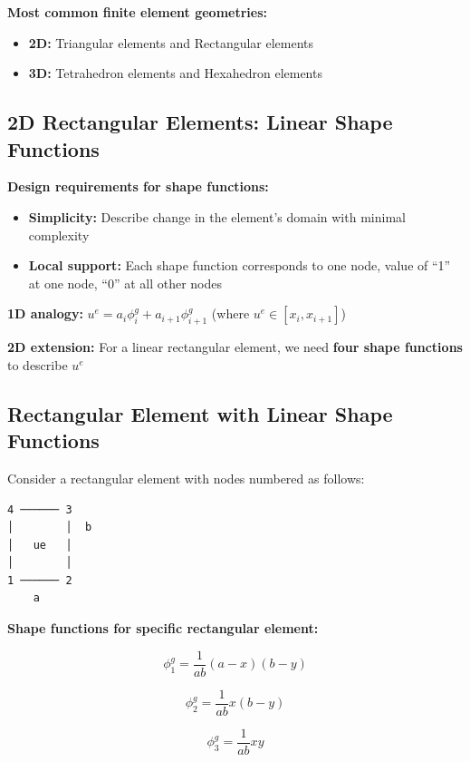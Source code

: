 \documentclass[
  11pt,
  a4paper,
]{scrbook}
\providecommand{\tightlist}{%
  \setlength{\itemsep}{0pt}\setlength{\parskip}{0pt}}\usepackage{longtable,booktabs,array}
\begin{document}
\textbf{Most common finite element geometries:}

\begin{itemize}
\tightlist
\item
  \textbf{2D:} Triangular elements and Rectangular elements
\item
  \textbf{3D:} Tetrahedron elements and Hexahedron elements
\end{itemize}

\subsection{2D Rectangular Elements: Linear Shape
Functions}\label{d-rectangular-elements-linear-shape-functions}

\textbf{Design requirements for shape functions:}

\begin{itemize}
\tightlist
\item
  \textbf{Simplicity:} Describe change in the element's domain with
  minimal complexity
\item
  \textbf{Local support:} Each shape function corresponds to one node,
  value of ``1'' at one node, ``0'' at all other nodes
\end{itemize}

\textbf{1D analogy:} \(u^e = a_i \phi_i^g + a_{i+1} \phi_{i+1}^g\)
(where \(u^e \in [x_i, x_{i+1}]\))

\textbf{2D extension:} For a linear rectangular element, we need
\textbf{four shape functions} to describe \(u^e\)

\subsection{Rectangular Element with Linear Shape
Functions}\label{rectangular-element-with-linear-shape-functions}

Consider a rectangular element with nodes numbered as follows:

\begin{verbatim}
4 ────── 3
│        │  b
│   ue   │
│        │
1 ────── 2
    a
\end{verbatim}

\textbf{Shape functions for specific rectangular element:}

\[\phi_1^g = \frac{1}{ab}(a-x)(b-y)\]

\[\phi_2^g = \frac{1}{ab}x(b-y)\]

\[\phi_3^g = \frac{1}{ab}xy\]
\end{document}
